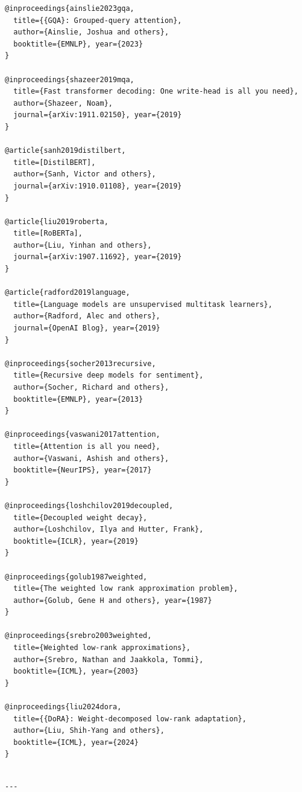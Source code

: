 \begin{lstlisting}
@inproceedings{ainslie2023gqa,
  title={{GQA}: Grouped-query attention},
  author={Ainslie, Joshua and others},
  booktitle={EMNLP}, year={2023}
}

@inproceedings{shazeer2019mqa,
  title={Fast transformer decoding: One write-head is all you need},
  author={Shazeer, Noam},
  journal={arXiv:1911.02150}, year={2019}
}

@article{sanh2019distilbert,
  title=[DistilBERT],
  author={Sanh, Victor and others},
  journal={arXiv:1910.01108}, year={2019}
}

@article{liu2019roberta,
  title=[RoBERTa],
  author={Liu, Yinhan and others},
  journal={arXiv:1907.11692}, year={2019}
}

@article{radford2019language,
  title={Language models are unsupervised multitask learners},
  author={Radford, Alec and others},
  journal={OpenAI Blog}, year={2019}
}

@inproceedings{socher2013recursive,
  title={Recursive deep models for sentiment},
  author={Socher, Richard and others},
  booktitle={EMNLP}, year={2013}
}

@inproceedings{vaswani2017attention,
  title={Attention is all you need},
  author={Vaswani, Ashish and others},
  booktitle={NeurIPS}, year={2017}
}

@inproceedings{loshchilov2019decoupled,
  title={Decoupled weight decay},
  author={Loshchilov, Ilya and Hutter, Frank},
  booktitle={ICLR}, year={2019}
}

@inproceedings{golub1987weighted,
  title={The weighted low rank approximation problem},
  author={Golub, Gene H and others}, year={1987}
}

@inproceedings{srebro2003weighted,
  title={Weighted low-rank approximations},
  author={Srebro, Nathan and Jaakkola, Tommi},
  booktitle={ICML}, year={2003}
}

@inproceedings{liu2024dora,
  title={{DoRA}: Weight-decomposed low-rank adaptation},
  author={Liu, Shih-Yang and others},
  booktitle={ICML}, year={2024}
}
\end{lstlisting}
\begin{lstlisting}

---
\end{lstlisting}